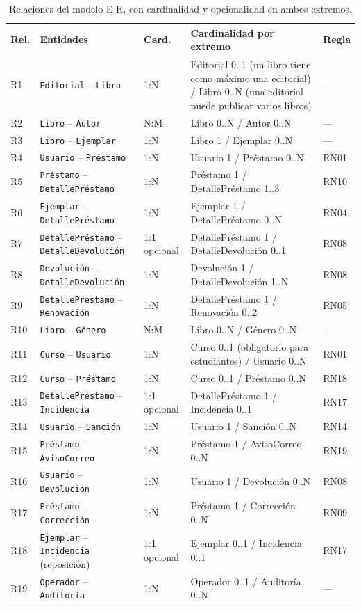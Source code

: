 \documentclass[11pt,a4paper]{article}
\begin{document}
\begin{table}[H]
\centering
\caption{Relaciones del modelo E-R, con cardinalidad y opcionalidad en ambos extremos.}
\small
\begin{tabularx}{\textwidth}{l l l Y l}
\toprule
\textbf{Rel.} & \textbf{Entidades} & \textbf{Card.} & \textbf{Cardinalidad por extremo} & \textbf{Regla}\\
\midrule
R1 & \texttt{Editorial} -- \texttt{Libro} & 1:N & Editorial 0..1 (un libro tiene como máximo una editorial) / Libro 0..N (una editorial puede publicar varios libros) & ---\\
R2 & \texttt{Libro} -- \texttt{Autor} & N:M & Libro 0..N / Autor 0..N & ---\\
R3 & \texttt{Libro} -- \texttt{Ejemplar} & 1:N & Libro 1 / Ejemplar 0..N & ---\\
R4 & \texttt{Usuario} -- \texttt{Préstamo} & 1:N & Usuario 1 / Préstamo 0..N & RN01\\
R5 & \texttt{Préstamo} -- \texttt{DetallePréstamo} & 1:N & Préstamo 1 / DetallePréstamo 1..3 & RN10\\
R6 & \texttt{Ejemplar} -- \texttt{DetallePréstamo} & 1:N & Ejemplar 1 / DetallePréstamo 0..N & RN04\\
R7 & \texttt{DetallePréstamo} -- \texttt{DetalleDevolución} & 1:1 opcional & DetallePréstamo 1 / DetalleDevolución 0..1 & RN08\\
R8 & \texttt{Devolución} -- \texttt{DetalleDevolución} & 1:N & Devolución 1 / DetalleDevolución 1..N & RN08\\
R9 & \texttt{DetallePréstamo} -- \texttt{Renovación} & 1:N & DetallePréstamo 1 / Renovación 0..2 & RN05\\
R10 & \texttt{Libro} -- \texttt{Género} & N:M & Libro 0..N / Género 0..N & ---\\
R11 & \texttt{Curso} -- \texttt{Usuario} & 1:N & Curso 0..1 (obligatorio para estudiantes) / Usuario 0..N & RN01\\
R12 & \texttt{Curso} -- \texttt{Préstamo} & 1:N & Curso 0..1 / Préstamo 0..N & RN18\\
R13 & \texttt{DetallePréstamo} -- \texttt{Incidencia} & 1:1 opcional & DetallePréstamo 1 / Incidencia 0..1 & RN17\\
R14 & \texttt{Usuario} -- \texttt{Sanción} & 1:N & Usuario 1 / Sanción 0..N & RN14\\
R15 & \texttt{Préstamo} -- \texttt{AvisoCorreo} & 1:N & Préstamo 1 / AvisoCorreo 0..N & RN19\\
R16 & \texttt{Usuario} -- \texttt{Devolución} & 1:N & Usuario 1 / Devolución 0..N & RN08\\
R17 & \texttt{Préstamo} -- \texttt{Corrección} & 1:N & Préstamo 1 / Corrección 0..N & RN09\\
R18 & \texttt{Ejemplar} -- \texttt{Incidencia} (reposición) & 1:1 opcional & Ejemplar 0..1 / Incidencia 0..1 & RN17\\
R19 & \texttt{Operador} -- \texttt{Auditoría} & 1:N & Operador 0..1 / Auditoría 0..N & ---\\
\bottomrule
\end{tabularx}
\end{table}
\end{document}
